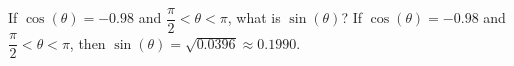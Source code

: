 {If $\cos(\theta) = -0.98$ and $\dfrac{\pi}{2} < \theta < \pi$, what is $\sin(\theta)$?}
{If $\cos(\theta) = -0.98$ and $\dfrac{\pi}{2} < \theta < \pi$, then $\sin(\theta) = \sqrt{0.0396} \approx 0.1990$.}
